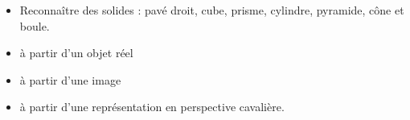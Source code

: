 \begin{prerequis}    
    \begin{itemize}
        \item[\emoji{diamond-suit}] Reconnaître des solides : pavé droit, cube, prisme, cylindre, pyramide, cône et boule.
        \item[\emoji{diamond-suit}] à partir d’un objet réel
        \item[\emoji{diamond-suit}] à partir d’une image
        \item[\emoji{diamond-suit}] à partir d’une représentation en perspective cavalière.        
    \end{itemize}
\end{prerequis}